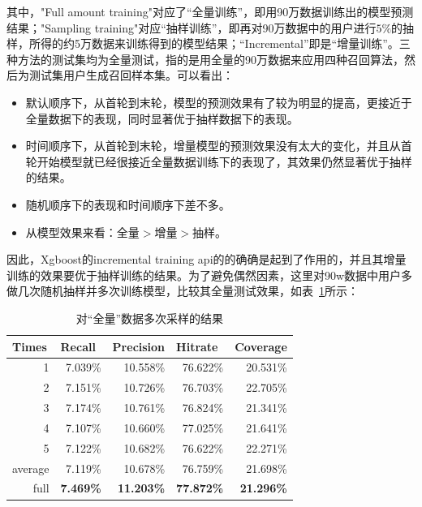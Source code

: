 其中，"Full amount training"对应了“全量训练”，即用90万数据训练出的模型预测结果；"Sampling training"对应“抽样训练”，即再对90万数据中的用户进行$5\%$的抽样，所得的约5万数据来训练得到的模型结果；“Incremental”即是“增量训练”。三种方法的测试集均为全量测试，指的是用全量的90万数据来应用四种召回算法，然后为测试集用户生成召回样本集。可以看出：
\begin{itemize}
	\item 默认顺序下，从首轮到末轮，模型的预测效果有了较为明显的提高，更接近于全量数据下的表现，同时显著优于抽样数据下的表现。
	\item 时间顺序下，从首轮到末轮，增量模型的预测效果没有太大的变化，并且从首轮开始模型就已经很接近全量数据训练下的表现了，其效果仍然显著优于抽样的结果。
	\item 随机顺序下的表现和时间顺序下差不多。
	\item 从模型效果来看：全量$>$增量$>$抽样。
\end{itemize}

因此，Xgboost的incremental training api的的确确是起到了作用的，并且其增量训练的效果要优于抽样训练的结果。为了避免偶然因素，这里对90w数据中用户多做几次随机抽样并多次训练模型，比较其全量测试效果，如表~\ref{tab:multiple_sampling}所示：
\begin{table}[htbp]
	\centering
	\caption{对“全量”数据多次采样的结果}
	\begin{tabular}{rrrrr}
		\toprule
		\multicolumn{1}{l}{Times} & \multicolumn{1}{l}{Recall} & \multicolumn{1}{l}{Precision} & \multicolumn{1}{l}{Hit\;rate} & \multicolumn{1}{l}{Coverage} \\
		\midrule
		1    & 7.039\% & 10.558\% & 76.622\% & 20.531\% \\
		2    & 7.151\% & 10.726\% & 76.703\% & 22.705\% \\
		3    & 7.174\% & 10.761\% & 76.824\% & 21.341\% \\
		4    & 7.107\% & 10.660\% & 77.025\% & 21.641\% \\
		5    & 7.122\% & 10.682\% & 76.622\% & 22.271\% \\
		average & 7.119\% & 10.678\% & 76.759\% & 21.698\% \\
		full & \textbf{7.469\%} & \textbf{11.203\%} & \textbf{77.872\%} & \textbf{21.296\%} \\
		\bottomrule
	\end{tabular}%
	\label{tab:multiple_sampling}%
\end{table}%


